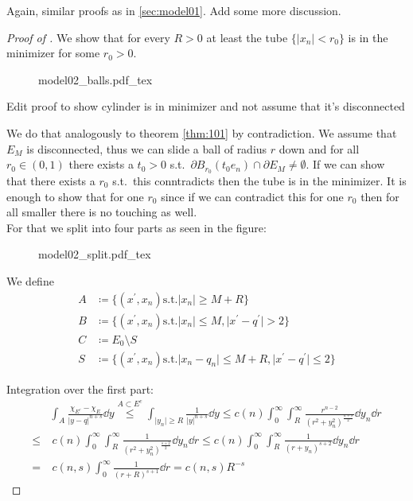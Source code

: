 Again, similar proofs as in \cref{sec:model01}.\newline
Add some more discussion.

\begin{proof}[Proof of ]
	We show that for every \( R > 0 \) at least the tube \( \{\lvert x_n \rvert < r_0 \}
	\) is in the minimizer for some \( r_0 > 0 \). \\
	\begin{figure}[h]
		\centering
		\def\svgwidth{0.5\textwidth}
		{model02_balls.pdf_tex}
		\caption{}
		\label{fig:105}
	\end{figure}
	\begin{TODO}
		Edit proof to show cylinder is in minimizer and not assume that it's disconnected
	\end{TODO}
	We do that analogously to theorem \cref{thm:101} by contradiction. We assume that \(
	E_M \) is disconnected, thus we can slide a ball of radius \( r \) down and for all \(
	r_0 \in (0, 1) \) there exists a \( t_0 > 0 \) s.t.\ \( \partial B_{r_0}(t_0 e_n) \cap
	\partial E_M \neq \emptyset \). If we can show that there exists a \( r_0 \) s.t.\
	this conntradicts then the tube is in the minimizer. It is enough to show that for one
	\( r_0 \) since if we can contradict this for one \( r_0 \) then for all smaller there
	is no touching as well. \\
	For that we split into four parts as seen in the figure:

	\begin{figure}[h]
		\centering
		\def\svgwidth{0.5\textwidth}
		{model02_split.pdf_tex}
		\caption{}
		\label{fig:106}
	\end{figure}
	We define
	\begin{align*}
		A & \coloneqq \{(x^\prime, x_n) \text{s.t.} \lvert x_n \rvert \geq M + R \} \\
		B & \coloneqq \{(x^\prime, x_n) \text{s.t.} \lvert x_n \rvert \leq M, \lvert x^\prime - q^\prime \rvert > 2 \} \\
		C & \coloneqq E_0 \setminus S \\
		S & \coloneqq \{(x^\prime, x_n) \text{s.t.} \lvert x_n - q_n \rvert \leq M + R, \lvert x^\prime - q^\prime \rvert \leq 2\}
	\end{align*}

	Integration over the first part:
	\begin{align*}
		     & \int_A \frac{\chi_{E^c} - \chi_E}{\lvert y - q\rvert^{n + s}} \dd{y} \overset{A \subset E^c}{\leq} \int_{\lvert y_n \rvert \geq R} \frac{1}{\lvert y \rvert^{n + s}} \dd{y} \leq c(n) \int_0^\infty \int_R^\infty \frac{r^{n - 2}}{(r^2 + y_n^2)^{\frac{n + s}{2}}} \dd{y_n} \dd{r} \\
		\leq & \ c(n) \int_0^\infty \int_R^\infty \frac{1}{(r^2 + y_n^2)^{\frac{s + 2}{2}}} \dd{y_n} \dd{r} \leq c(n) \int_0^\infty \int_R^\infty \frac{1}{(r + y_n)^{s + 2}} \dd{y_n} \dd{r} \\
		=    & \ c(n, s) \int_0^\infty \frac{1}{(r + R)^{s + 1}} \dd{r} = c(n, s) R^{- s}
	\end{align*}


\end{proof}
